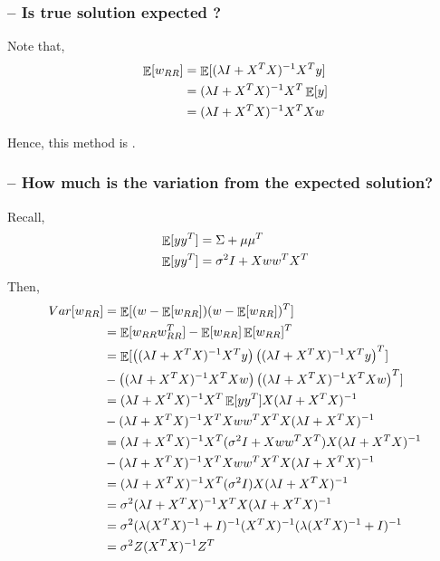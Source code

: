 \documentclass{article}
\begin{document}
\subsubsection{-- Is true solution expected ?}

Note that,
\begin{align*}
    \operatorname*{\mathop{\mathbb{E}}}[w_{RR}] &= \operatorname*{\mathop{\mathbb{E}}}[(\lambda I + X^TX)^{-1}X^Ty]\\
    &= (\lambda I + X^TX)^{-1}X^T \operatorname*{\mathop{\mathbb{E}}}[y]\\
    &= (\lambda I + X^TX)^{-1} X^TX w\\
\end{align*}

Hence, this method is .

\subsubsection{-- How much is the variation from the expected solution?}
Recall,
\begin{align*}
    \operatorname*{\mathop{\mathbb{E}}}[yy^T] &= \Sigma + \mu\mu^T\\
    \operatorname*{\mathop{\mathbb{E}}}[yy^T] &= \sigma^2I + Xww^TX^T\\
\end{align*}
Then,
\begin{align*}
    Var[w_{RR}] &= \operatorname*{\mathop{\mathbb{E}}}[(w-\operatorname*{\mathop{\mathbb{E}}}[w_{RR}])(w-\operatorname*{\mathop{\mathbb{E}}}[w_{RR}])^T]\\
    & = \operatorname*{\mathop{\mathbb{E}}}[w_{RR}w_{RR}^T]-\operatorname*{\mathop{\mathbb{E}}}[w_{RR}]\operatorname*{\mathop{\mathbb{E}}}[w_{RR}]^T\\
    & = \operatorname*{\mathop{\mathbb{E}}}[\left( (\lambda I + X^TX)^{-1} X^Ty \right) \left( (\lambda I + X^TX)^{-1} X^Ty \right)^T] \\
    & -\left( (\lambda I + X^TX)^{-1} X^TX w \right) \left( (\lambda I + X^TX)^{-1} X^TX w \right)^T]\\
    & = (\lambda I + X^TX)^{-1} X^T \operatorname*{\mathop{\mathbb{E}}}[yy^T] X (\lambda I + X^TX)^{-1} \\
    & - (\lambda I + X^TX)^{-1} X^TX ww^T X^T X (\lambda I + X^TX)^{-1}\\
    & = (\lambda I + X^TX)^{-1} X^T (\sigma^2I + Xww^TX^T) X (\lambda I + X^TX)^{-1} \\
    & - (\lambda I + X^TX)^{-1} X^TX ww^T X^T X (\lambda I + X^TX)^{-1}\\
    & = (\lambda I + X^TX)^{-1} X^T (\sigma^2I) X (\lambda I + X^TX)^{-1}\\
    & = \sigma^2 (\lambda I + X^TX)^{-1} X^T X (\lambda I + X^TX)^{-1}\\
    & = \sigma^2 (\lambda (X^TX)^{-1} + I)^{-1} (X^T X)^{-1} (\lambda (X^TX)^{-1} + I)^{-1}\\
    & = \sigma^2 Z (X^T X)^{-1} Z^T\\
\end{align*}
\end{document}
